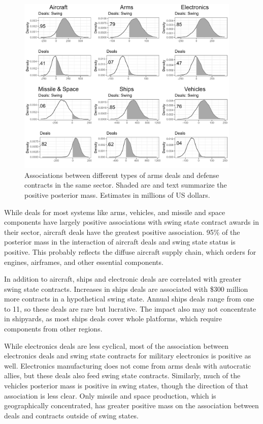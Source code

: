 \documentclass[12pt]{article}
\begin{document}
\begin{figure}[htpb]
	\centering
		\includegraphics[width=0.95\textwidth]{../figures/me-deals-sector.png}
	\caption{Associations between different types of arms deals and defense contracts in the same sector. Shaded are and text summarize the positive posterior mass. Estimates in millions of US dollars.}
	\label{fig:me-deals-sector}
\end{figure}


While deals for most systems like arms, vehicles, and missile and space components have largely positive associations with swing state contract awards in their sector, aircraft deals have the greatest positive association. 
95\% of the posterior mass in the interaction of aircraft deals and swing state status is positive.
This probably reflects the diffuse aircraft supply chain, which orders for engines, airframes, and other essential components. 


In addition to aircraft, ships and electronic deals are correlated with greater swing state contracts. 
Increases in ships deals are associated with \$300 million more contracts in a hypothetical swing state. 
Annual ships deals range from one to 11, so these deals are rare but lucrative. 
The impact also may not concentrate in shipyards, as most ships deals cover whole platforms, which require components from other regions. 

 
While electronics deals are less cyclical, most of the association between electronics deals and swing state contracts for military electronics is positive as well.
Electronics manufacturing does not come from arms deals with autocratic allies, but these deals also feed swing state contracts. 
Similarly, much of the vehicles posterior mass is positive in swing states, though the direction of that association is less clear. 
Only missile and space production, which is geographically concentrated, has greater positive mass on the association between deals and contracts outside of swing states.
\end{document}

